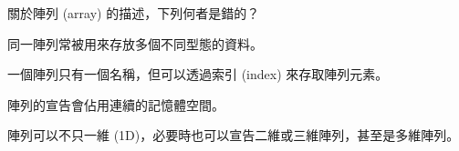 \ifx\ntpcNinetyThree\undefined[93學年基北區] \fi
關於陣列 (array) 的描述，下列何者是錯的？
  \begin{optionlist}
  \item 同一陣列常被用來存放多個不同型態的資料。\label{ntpc-93-a8}
  \item 一個陣列只有一個名稱，但可以透過索引 (index) 來存取陣列元素。
  \item 陣列的宣告會佔用連續的記憶體空間。
  \item 陣列可以不只一維 (1D)，必要時也可以宣告二維或三維陣列，甚至是多維陣列。
  \end{optionlist}